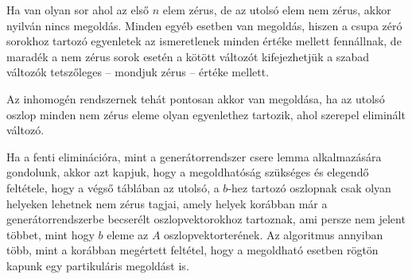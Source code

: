\documentclass[9pt, a4paper, showtrims]{memoir}
\theoremstyle{plain}
\theoremstyle{remark}
\theoremstyle{definition}
\begin{document}
Ha van olyan sor ahol az első $n$ elem zérus, de az utolsó elem nem zérus, 
akkor nyilván nincs megoldás.
Minden egyéb esetben van megoldás, 
hiszen a csupa zéró sorokhoz tartozó egyenletek az ismeretlenek minden értéke mellett fennállnak,
de maradék a nem zérus sorok esetén a kötött változót
kifejezhetjük a szabad változók tetszőleges -- mondjuk zérus -- értéke mellett.

Az inhomogén rendszernek tehát pontosan akkor van megoldása, 
ha az utolsó oszlop minden nem zérus eleme olyan egyenlethez tartozik, 
ahol szerepel eliminált változó.

Ha a fenti eliminációra, mint a generátorrendszer csere lemma alkalmazására gondolunk,
akkor azt kapjuk, hogy a megoldhatóság szükséges és elegendő feltétele,
hogy a végső táblában az utolsó, a $b$-hez tartozó oszlopnak csak olyan helyeken lehetnek nem zérus tagjai,
amely helyek korábban már a generátorrendszerbe becserélt oszlopvektorokhoz tartoznak,
ami persze nem jelent többet, mint hogy $b$ eleme az $A$ oszlopvektorterének.
Az algoritmus annyiban több, mint a korábban megértett feltétel, 
hogy a megoldható esetben rögtön kapunk egy partikuláris megoldást is.
\end{document}
